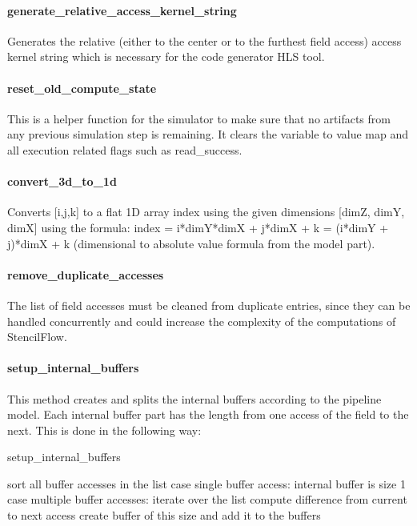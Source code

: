 \paragraph{generate\_relative\_access\_kernel\_string}
Generates the relative (either to the center or to the furthest field access) access kernel string which is necessary for the code generator HLS tool.


\paragraph{reset\_old\_compute\_state}
This is a helper function for the simulator to make sure that no artifacts from any previous simulation step is remaining. It clears the variable to value map and all execution related flags such as read\_success.


\paragraph{convert\_3d\_to\_1d}
Converts [i,j,k] to a flat 1D array index using the given dimensions [dimZ, dimY, dimX] using the formula:
index = i*dimY*dimX + j*dimX + k = (i*dimY + j)*dimX + k (dimensional to absolute value formula from the model part).


\paragraph{remove\_duplicate\_accesses}
The list of field accesses must be cleaned from duplicate entries, since they can be handled concurrently and could increase the complexity of the computations of StencilFlow.


\paragraph{setup\_internal\_buffers}
This method creates and splits the internal buffers according to the pipeline model. Each internal buffer part has the length from one access of the field to the next. This is done in the following way:
\begin{algorithm}
	\caption{setup\_internal\_buffers}
	\begin{algorithmic}
		\STATE sort all buffer accesses in the list
		\STATE case single buffer access: internal buffer is size 1
		\STATE case multiple buffer accesses: iterate over the list
		\STATE compute difference from current to next access
		\STATE create buffer of this size and add it to the buffers
	\end{algorithmic}
\end{algorithm}


